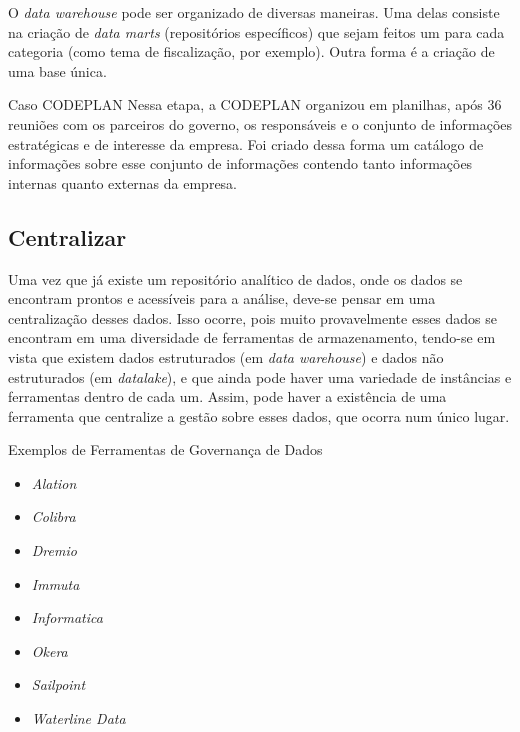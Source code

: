 O \emph{data warehouse} pode ser organizado de diversas maneiras. Uma delas consiste na criação de \emph{data marts} (repositórios específicos) que sejam feitos um para cada categoria (como tema de fiscalização, por exemplo). Outra forma é a criação de uma base única. 

    \begin{env-caso}{Caso CODEPLAN}
        Nessa etapa, a CODEPLAN organizou em planilhas, após 36 reuniões com os parceiros do governo, os responsáveis e o conjunto de informações estratégicas e de interesse da empresa. Foi criado dessa forma um catálogo de informações sobre esse conjunto de informações contendo tanto informações internas quanto externas da empresa.
    \end{env-caso}

    \subsection{Centralizar} \label{sec:centralizar}
    
    Uma vez que já existe um repositório analítico de dados, onde os dados se encontram prontos e acessíveis para a análise, deve-se pensar em uma centralização desses dados. Isso ocorre, pois muito provavelmente esses dados se encontram em uma diversidade de ferramentas de armazenamento, tendo-se em vista que existem dados estruturados (em \emph{data warehouse}) e dados não estruturados (em \emph{datalake}), e que ainda pode haver uma variedade de instâncias e ferramentas dentro de cada um. Assim, pode haver a existência de uma ferramenta que centralize a gestão sobre esses dados, que ocorra num único lugar. 

    \begin{env-sistemas}{Exemplos de Ferramentas de Governança de Dados}
         \begin{multicols}{2}
            \begin{itemize}
                \item \emph{Alation}
                \item \emph{Colibra}
                \item \emph{Dremio}
                \item \emph{Immuta}
                \item \emph{Informatica}
                \item \emph{Okera}
                \item \emph{Sailpoint}
                \item \emph{Waterline Data}
            \end{itemize}
        \end{multicols}
    \end{env-sistemas}
    
